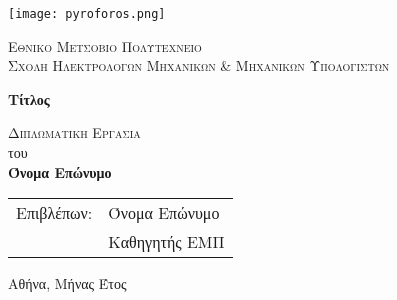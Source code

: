 \begin{titlepage}
    \begin{center}
        \vspace*{-1cm}
        
        \texttt{[image: pyroforos.png]}
        
        \Large
        \textsc{Εθνικο Μετσοβιο Πολυτεχνειο}\\
        \large
        \textsc{Σχολη Ηλεκτρολογων Μηχανικων \& Μηχανικων Υπολογιστων}
                
        \vspace{2.5cm}
        
        \Huge
        \textbf{Τίτλος}
        
        \vspace{3cm}
        \Large
        \textsc{Διπλωματικη Εργασια}\\
        του\\

        \LARGE
        \textbf{Όνομα Επώνυμο}
        
    \end{center}
    
    \vspace{3cm}
    
    \begin{tabular}{ll}
		Επιβλέπων: & Όνομα Επώνυμο \\
		 & Καθηγητής ΕΜΠ
	\end{tabular}
	
    \vfill
    
    \begin{center}
    	 Αθήνα, Μήνας Έτος	
    \end{center}
\end{titlepage}